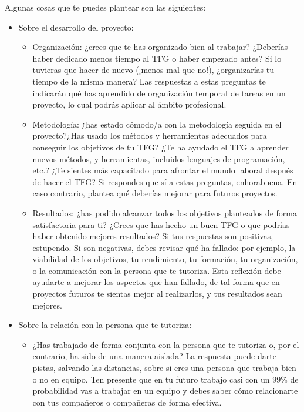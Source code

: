 Algunas cosas que te puedes plantear son las siguientes:

\begin{itemize}
    \item Sobre el desarrollo del proyecto:
        \begin{itemize}
            \item Organización: ¿crees que te has organizado bien al trabajar? ¿Deberías haber dedicado menos tiempo al TFG o haber empezado antes? Si lo tuvieras que hacer de nuevo (¡menos mal que no!), ¿organizarías tu tiempo de la misma manera? Las respuestas a estas preguntas te indicarán qué has aprendido de organización temporal de tareas en un proyecto, lo cual podrás aplicar al ámbito profesional.
            \item Metodología: ¿has estado cómodo/a con la metodología seguida en el proyecto?¿Has usado los métodos y herramientas adecuados para conseguir los objetivos de tu TFG? ¿Te ha ayudado el TFG a aprender nuevos métodos, y herramientas, incluidos lenguajes de programación, etc.? ¿Te sientes más capacitado para afrontar el mundo laboral después de hacer el TFG? Si respondes que sí a estas preguntas, enhorabuena. En caso contrario, plantea qué deberías mejorar para futuros proyectos.
            \item Resultados: ¿has podido alcanzar todos los objetivos planteados de forma satisfactoria para ti? ¿Crees que has hecho un buen TFG o que podrías haber obtenido mejores resultados? Si tus respuestas son positivas, estupendo. Si son negativas, debes revisar qué ha fallado: por ejemplo, la viabilidad de los objetivos, tu rendimiento, tu formación, tu organización, o la comunicación con la persona que te tutoriza. Esta reflexión debe ayudarte a mejorar los aspectos que han fallado, de tal forma que en proyectos futuros te sientas mejor al realizarlos, y tus resultados sean mejores.
        \end{itemize}
    \item Sobre la relación con la persona que te tutoriza:
        \begin{itemize}
            \item ¿Has trabajado de forma conjunta con la persona que te tutoriza o, por el contrario, ha sido de una manera aislada? La respuesta puede darte pistas, salvando las distancias, sobre si eres una persona que trabaja bien o no en equipo. Ten presente que en tu futuro trabajo casi con un 99\% de probabilidad vas a trabajar en un equipo y debes saber cómo relacionarte con tus compañeros o compañeras de forma efectiva. 

\end{itemize}
\end{itemize}
